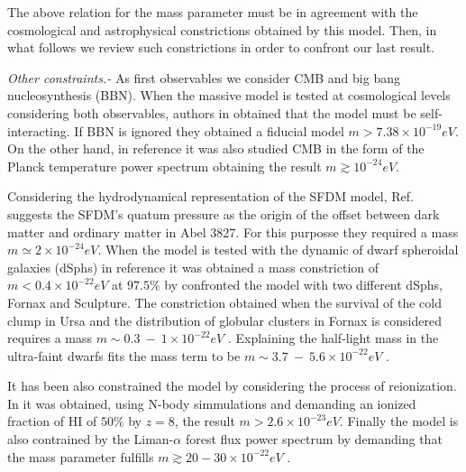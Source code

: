 \documentclass[amssymb,twocolumn,prd,nofootinbib,showpacs]{revtex4-1}
\begin{document}
The above relation for the mass parameter must be in agreement with the cosmological and astrophysical constrictions  obtained by this model. Then, in what follows we review such constrictions in order to confront our last result.

\textit{Other constraints.-} As first observables we consider CMB and big bang nucleosynthesis (BBN). When the massive model is tested at cosmological levels considering both observables, authors in \cite{SFphi41,SFphi42} obtained that the model must be self-interacting. If BBN is ignored they obtained a fiducial model $m>7.38\times10^{-19}eV$. On the other hand, in reference \cite{constn1} it was also studied CMB in the form of the Planck temperature power spectrum obtaining the result $m\gtrsim 10^{-24}eV$.

Considering the hydrodynamical representation of the SFDM model, Ref. \cite{constn2} suggests the SFDM's quatum pressure as the origin of the offset between dark matter and ordinary matter in Abel 3827. For this purposse they required a mass  $m\simeq 2\times 10^{-24}eV$. When the model is tested with the dynamic of dwarf spheroidal galaxies (dSphs) in reference \cite{constn3} it was obtained a mass constriction of $m<0.4\times 10^{-22}eV$ at $97.5\%$ by confronted the model with two different dSphs, Fornax and Sculpture. The constriction obtained when the survival of the cold clump in Ursa and the distribution of globular clusters in Fornax is considered requires a mass $m\sim 0.3\ - \ 1\times 10^{-22}eV$ \cite{constn4}. Explaining the half-light mass in the ultra-faint dwarfs fits the mass term to be $m\sim 3.7 \ - \ 5.6\times 10^{-22}eV$ \cite{constn5}.

It has been also constrained the model by considering the process of reionization. In \cite{constn6} it was obtained, using N-body simmulations and demanding an ionized fraction of HI of $50\%$ by $z=8$, the result $m>2.6\times 10^{-23}eV$. Finally the model is also contrained by the Liman-$\alpha$ forest flux power spectrum by demanding that the mass parameter fulfills $m\gtrsim 20-30\times 10^{-22}eV$ \cite{constn7,constn8}.
\end{document}

